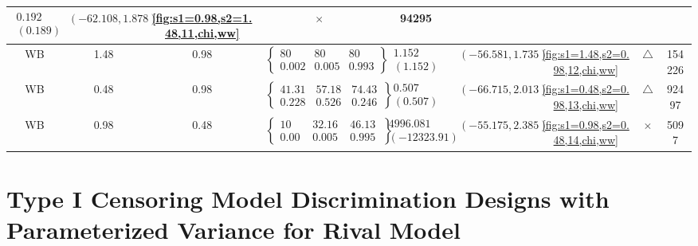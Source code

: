 \begin{table}[H]
\begin{adjustwidth}{-2.5cm}{-2.5cm}
{\begin{tabular}{|c|c|c|c|c|c|c|c|c|}
$\begin{array}{c}
0.192 \\
(0.189)
\end{array}$ & 
$(-62.108, 1.878)$ & 
\ref{fig:s1=0.98,s2=1.48,11,chi,ww} & $\times$ & 94295 \\
\hline
WB & 1.48 & 0.98 & $\left\{\begin{array}{ccc}
80 & 80 & 80 \\
0.002 & 0.005 & 0.993
\end{array}\right\}$ &
$\begin{array}{c}
1.152 \\
(1.152)
\end{array}$ & 
$(-56.581, 1.735)$ & 
\ref{fig:s1=1.48,s2=0.98,12,chi,ww} & $\triangle$ & 154226 \\
\hline
WB & 0.48 & 0.98 & $\left\{\begin{array}{ccc}
41.312 & 57.184 & 74.433 \\
0.228 & 0.526 & 0.246
\end{array}\right\}$ &
$\begin{array}{c}
0.507 \\
(0.507)
\end{array}$ & 
$(-66.715, 2.013)$ & 
\ref{fig:s1=0.48,s2=0.98,13,chi,ww} & $\triangle$ & 92497 \\
\hline
WB & 0.98 & 0.48 & $\left\{\begin{array}{ccc}
10 & 32.163 & 46.132 \\
0.000 & 0.005 & 0.995
\end{array}\right\}$ &
$\begin{array}{c}
4996.081 \\
(-12323.91)
\end{array}$ & 
$(-55.175, 2.385)$ & 
\ref{fig:s1=0.98,s2=0.48,14,chi,ww} & $\times$ & 5097 \\
\hline
\end{tabular}
}
\end{adjustwidth}
\end{table}

\section{Type I Censoring Model Discrimination Designs with Parameterized Variance for Rival Model}

